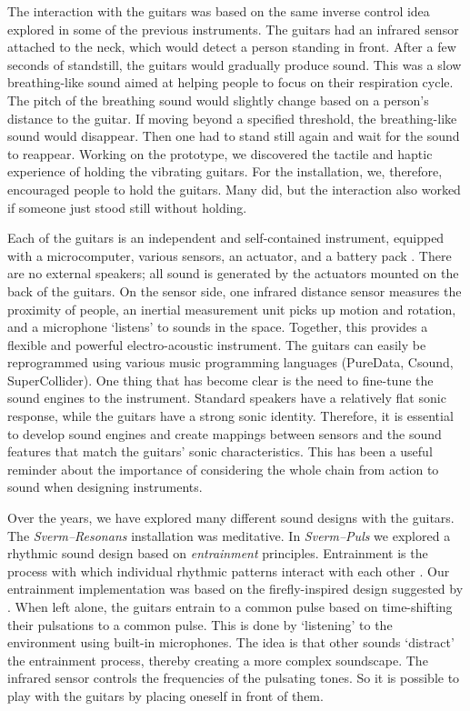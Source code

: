 The interaction with the guitars was based on the same inverse control idea explored in some of the previous instruments. The guitars had an infrared sensor attached to the neck, which would detect a person standing in front. After a few seconds of standstill, the guitars would gradually produce sound. This was a slow breathing-like sound aimed at helping people to focus on their respiration cycle. The pitch of the breathing sound would slightly change based on a person's distance to the guitar. If moving beyond a specified threshold, the breathing-like sound would disappear. Then one had to stand still again and wait for the sound to reappear. Working on the prototype, we discovered the tactile and haptic experience of holding the vibrating guitars. For the installation, we, therefore, encouraged people to hold the guitars. Many did, but the interaction also worked if someone just stood still without holding.

Each of the guitars is an independent and self-contained instrument, equipped with a microcomputer, various sensors, an actuator, and a battery pack \citep{gonzalez_sanchez_bela-based_2018}. There are no external speakers; all sound is generated by the actuators mounted on the back of the guitars. On the sensor side, one infrared distance sensor measures the proximity of people, an inertial measurement unit picks up motion and rotation, and a microphone `listens' to sounds in the space. Together, this provides a flexible and powerful electro-acoustic instrument. The guitars can easily be reprogrammed using various music programming languages (PureData, Csound, SuperCollider). One thing that has become clear is the need to fine-tune the sound engines to the instrument. Standard speakers have a relatively flat sonic response, while the guitars have a strong sonic identity. Therefore, it is essential to develop sound engines and create mappings between sensors and the sound features that match the guitars' sonic characteristics. This has been a useful reminder about the importance of considering the whole chain from action to sound when designing instruments.

Over the years, we have explored many different sound designs with the guitars. The \emph{Sverm--Resonans} installation was meditative. In \emph{Sverm--Puls} we explored a rhythmic sound design based on \emph{entrainment} principles. Entrainment is the process with which individual rhythmic patterns interact with each other \citep{clayton_interpersonal_2020}. Our entrainment implementation was based on the firefly-inspired design suggested by \citet{nymoen_decentralized_2014}. When left alone, the guitars entrain to a common pulse based on time-shifting their pulsations to a common pulse. This is done by `listening' to the environment using built-in microphones. The idea is that other sounds `distract' the entrainment process, thereby creating a more complex soundscape. The infrared sensor controls the frequencies of the pulsating tones. So it is possible to play with the guitars by placing oneself in front of them.

